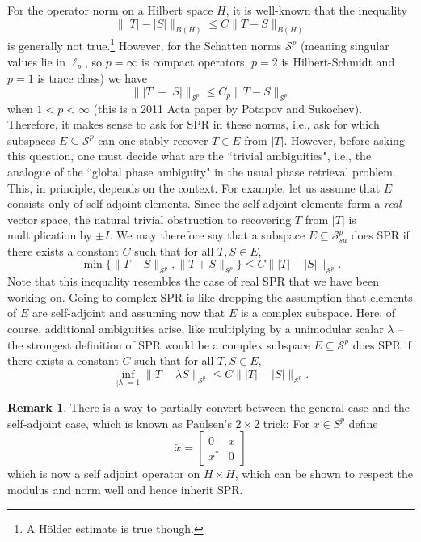 \documentclass[12pt,leqno]{amsart}
\numberwithin{equation}{section}
\theoremstyle{plain}
\theoremstyle{definition}
\newtheorem{remark}[theorem]{Remark}
\begin{document}
For the operator norm on a Hilbert space $H$, it is well-known that the inequality 
$$\||T|-|S|\|_{B(H)}\leq C\|T-S\|_{B(H)}$$
is generally not true.\footnote{A H\"older estimate is true though.} %
However, for the Schatten norms $\mathcal{S}^p$ (meaning singular values lie in $\ell_p$, so $p=\infty$ is compact operators, $p=2$ is Hilbert-Schmidt and $p=1$ is trace class) we have
$$\||T|-|S|\|_{\mathcal{S}^p}\leq C_p\|T-S\|_{\mathcal{S}^p}$$
when $1<p<\infty$ (this is a 2011 Acta paper by Potapov and Sukochev). Therefore, it makes sense to ask for SPR in these norms, i.e., ask for which subspaces $E\subseteq \mathcal{S}^p$ can one  stably recover $T\in E$ from $|T|$. However, before asking this question, one must  decide what are the ``trivial ambiguities", i.e., the analogue of the ``global phase ambiguity" in the usual phase retrieval problem. This, in principle, depends on the context. For example, let us assume that $E$ consists only of self-adjoint elements. Since the self-adjoint elements form a \emph{real} vector space, the natural trivial obstruction to recovering $T$ from $|T|$ is multiplication by $\pm I$. We may therefore say that a subspace $E\subseteq \mathcal{S}^p_{sa}$ does SPR if there exists a constant $C$ such that for all $T,S\in E$,
$$\min\{\|T-S\|_{\mathcal{S}^p},\|T+S\|_{\mathcal{S}^p}\}\leq C\||T|-|S|\|_{\mathcal{S}^p}.$$
Note that this inequality resembles the case of real SPR that we have been working on. Going to complex SPR is like dropping the assumption that elements of $E$ are self-adjoint and assuming now that $E$ is a complex subspace. Here, of course, additional ambiguities arise, like multiplying by a unimodular scalar $\lambda$ -- the strongest definition of SPR would be a complex subspace $E\subseteq \mathcal{S}^p$ does SPR if there exists a constant $C$ such that for all $T,S\in E$,
$$\inf_{|\lambda|=1}\|T-\lambda S\|_{\mathcal{S}^p}\leq C\||T|-|S|\|_{\mathcal{S}^p}.$$
\begin{remark}
    There is a way to partially convert between the general case and the self-adjoint case, which is known as Paulsen's $2\times 2$ trick: For $x\in S^p$ define 
    $$ \tilde{x}=
  \begin{bmatrix}
    0 & x \\
    x^* & 0 
  \end{bmatrix}
$$
which is now a self adjoint operator on $H\times H$, which can be shown to respect the modulus and norm well and hence inherit SPR.
\end{remark}
\end{document}
